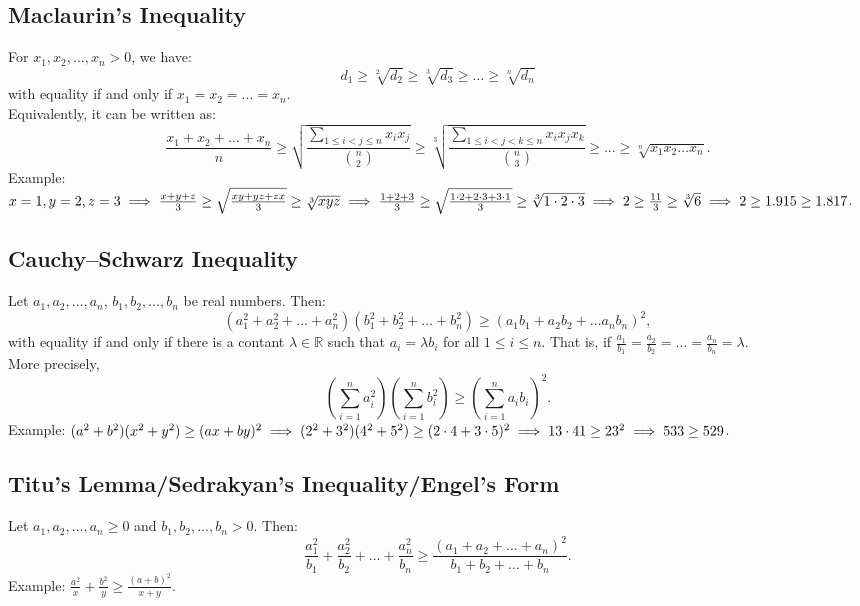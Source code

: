 \documentclass[a4paper,11pt]{article}
\begin{document}
\subsection{Maclaurin's Inequality}
\begin{tcolorbox}[breakable]
    For $x_1, x_2, \dots, x_n > 0$, we have:
    \[
    d_1 \geq \sqrt[2]{d_2} \geq \sqrt[3]{d_3} \geq \dots \geq \sqrt[n]{d_n}
    \]
    with equality if and only if $x_1 = x_2 = \dots = x_n$. \\[6pt]
    Equivalently, it can be written as:
    \[
    \frac{x_1+x_2+\dots+x_n}{n} \geq \sqrt{\frac{\sum_{1\leq i<j\leq n} x_ix_j}{\binom{n}{2}}} \geq \sqrt[3]{\frac{\sum_{1\leq i<j<k\leq n} x_ix_jx_k}{\binom{n}{3}}} \geq \dots \geq \sqrt[n]{x_1x_2\dots x_n}.
    \]
    Example: $\textstyle x=1, y=2, z=3 \implies \frac{x+y+z}{3} \geq \sqrt{\frac{xy + yz + zx}{3}} \geq \sqrt[3]{xyz} \\[6pt]
    \implies \frac{1+2+3}{3} \geq \sqrt{\frac{1\cdot2 + 2\cdot3 + 3\cdot1}{3}} \geq \sqrt[3]{1\cdot2\cdot3} \implies 2 \geq \frac{11}{3} \geq \sqrt[3]{6} \implies 2 \geq 1.915 \geq 1.817$.
\end{tcolorbox}


\subsection{Cauchy–Schwarz Inequality}
\begin{tcolorbox}[breakable]
    Let $a_1, a_2, \dots, a_n$, $b_1, b_2, \dots, b_n$ be real numbers. Then:
    \[
    (a_1^2 + a_2^2 + \dots + a_n^2)(b_1^2 + b_2^2 + \dots + b_n^2) \geq (a_1b_1 + a_2b_2 + \dots a_nb_n)^2,
    \]
    with equality if and only if there is a contant $\lambda \in \mathbb{R}$ such that $a_i = \lambda b_i$ for all $1 \leq i \leq n$. That is, if $\textstyle \frac{a_1}{b_1} = \frac{a_2}{b_2} = \dots = \frac{a_n}{b_n} = \lambda$. \\[6pt]
    More precisely,
    \[
    \left(\sum_{i=1}^n a_i^2\right)\left(\sum_{i=1}^n b_i^2\right) \geq \left(\sum_{i=1}^n a_ib_i\right)^2.
    \]
    Example: $\textstyle (a^2+b^2)(x^2+y^2) \geq (ax+by)^2 \implies (2^2 + 3^2)(4^2 + 5^2) \geq (2\cdot4+3\cdot5)^2 \\[6pt]
    \implies 13\cdot41\geq23^2 \implies 533\geq529$.
\end{tcolorbox}


\subsection{Titu's Lemma/Sedrakyan's Inequality/Engel's Form}
\begin{tcolorbox}[breakable]
    Let $a_1,a_2,\dots,a_n\geq0$ and $b_1,b_2,\dots,b_n>0$. Then:
    \[
    \frac{a_1^2}{b_1} + \frac{a_2^2}{b_2} + \dots + \frac{a_n^2}{b_n} \geq \frac{(a_1+a_2+\dots+a_n)^2}{b_1+b_2+\dots+b_n}.
    \]
    Example: $\textstyle \frac{a^2}{x} + \frac{b^2}{y} \geq \frac{(a+b)^2}{x+y}$.
\end{tcolorbox}
\end{document}
